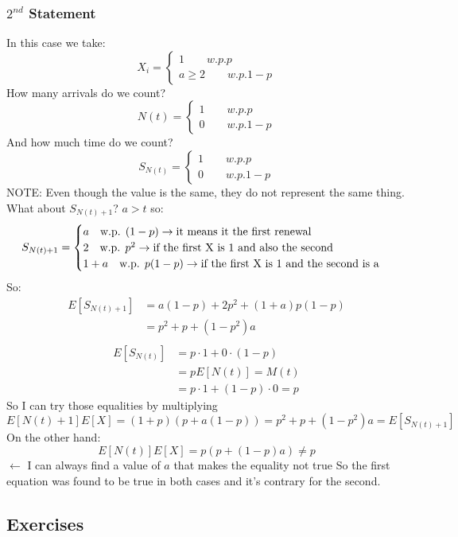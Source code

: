\documentclass[a4paper, 12pt, openright]{book}
\theoremstyle{theoremdd}
\theoremstyle{remark}
\def \beq {\begin{equation}}
\def\eeq{\end{equation}}
\begin{document}
\subsubsection*{$2^{nd}$ Statement}
In this case we take:
\beq
X_i =
\begin{cases}
1 \qquad w.p. p\\
a \geq 2 \qquad w.p. 1-p
\end{cases}
\eeq
How many arrivals do we count?
\beq
N(t) = 
\begin{cases}
1 \qquad w.p. p\\
0 \qquad w.p. 1-p
\end{cases}
\eeq
And how much time do we count?
\beq
S_{N(t)}=
\begin{cases}
1 \qquad w.p. p\\
0 \qquad w.p. 1-p
\end{cases}
\eeq
NOTE: Even though the value is the same, they do not represent the same thing.\\
What about $S_{N(t)+1}$? $a>t$ so:
\beq
S_{N(t)+1} =
\begin{cases}
a \quad \text{w.p. $ (1-p)$}  \rightarrow \text{it means it the first renewal}\\
2  \quad \text{w.p.  $p^2$}  \rightarrow \text{if the first  X is 1 and also the second}\\
1+a \quad \text{w.p. $ p(1-p)$} \rightarrow \text{if the first X is 1 and the second is a}\\
\end{cases}
\eeq
So:
\beq
\begin{split}
E[S_{N(t)+1}] & = a(1-p)+2p^2+(1+a)p(1-p)\\
                        & = p^2 + p + (1-p^2)a\\
\end{split}
\eeq
\beq
\begin{split}
E[S_{N(t)}] & = p\cdot1 + 0\cdot(1-p)\\
	         & = p E[N(t)] = M(t)\\
	         & =  p\cdot1 + (1-p)\cdot0 = p
\end{split}
\eeq
So I can try those equalities by multiplying
\beq
E[N(t)+1]E[X] = (1+p)(p+a(1-p)) = p^2+p+(1-p^2)a = E[S_{N(t)+1}]
\eeq
On the other hand:
\beq
E[N(t)]E[X] = p(p+(1-p)a) \ne p
\eeq
$\leftarrow$ {I can always find a value of $a$ that makes the equality not true}
So the first equation was found to be true in both cases and it's contrary for the second.
\subsection{Exercises}
\end{document}
